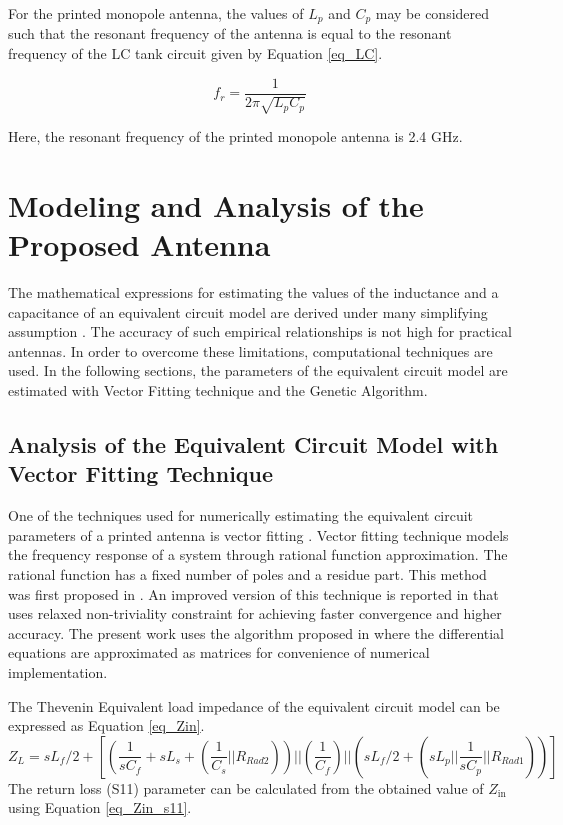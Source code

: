 For the printed monopole antenna, the values of $L_p$ and $C_p$ may be considered such that the resonant frequency of the antenna is equal to the resonant frequency of the LC tank circuit given by Equation \ref{eq_LC}.

\begin{equation}\label{eq_LC}
f_r = \frac{1}{2\pi \sqrt{L_p C_p}}
\end{equation}

Here, the resonant frequency of the printed monopole antenna is 2.4 GHz.

\section{Modeling and Analysis of the Proposed Antenna}\label{sec:analysis}
The mathematical expressions for estimating the values of the inductance and a capacitance of an equivalent circuit model are derived under many simplifying assumption \cite{handbook}. The accuracy of such empirical relationships is not high for practical antennas. In order to overcome these limitations, computational techniques are used. In the following sections, the parameters of the equivalent circuit model are estimated with Vector Fitting technique and the Genetic Algorithm.

\subsection{Analysis of the Equivalent Circuit Model with Vector Fitting Technique}
One of the techniques used for numerically estimating the equivalent circuit parameters of a printed antenna is vector fitting \cite{vectorfitting1, vectorfitting2, vectorfitting3}. Vector fitting technique models the frequency response of a system through rational function approximation. The rational function has a fixed number of poles and a residue part. This method was first proposed in \cite{vfit3_1}. An improved version of this technique is reported in \cite{vfit3_2} that uses relaxed non-triviality constraint for achieving faster convergence and higher accuracy. The present work uses the algorithm proposed in \cite{vfit3_3} where the differential equations are approximated as matrices for convenience of numerical implementation.

The Thevenin Equivalent load impedance of the equivalent circuit model can be expressed as Equation \ref{eq_Zin}.
{\small
\begin{equation}\label{eq_Zin}
Z_{L} = sL_f/2 + \left[\left(\frac{1}{sC_f}+sL_s+\left(\frac{1}{C_s} || R_{Rad2}\right)\right) || \left(\frac{1}{C_f}\right) || \left(sL_f/2 + \left(sL_p || \frac{1}{sC_p} || R_{Rad1}\right)\right)\right]
\end{equation}}
The return loss (S11) parameter can be calculated from the obtained value of $Z_{\text{in}}$ using Equation \ref{eq_Zin_s11}.

